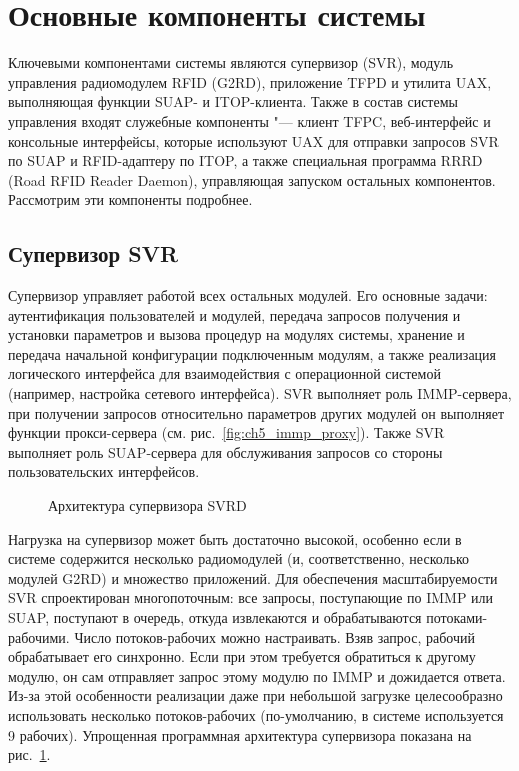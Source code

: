 \section{Основные компоненты системы}\label{sec:ch5_components}

Ключевыми компонентами системы являются супервизор (SVR), модуль управления радиомодулем RFID (G2RD), приложение TFPD и утилита UAX, выполняющая функции SUAP- и ITOP-клиента. Также в состав системы управления входят служебные компоненты "--- клиент TFPC, веб-интерфейс и консольные интерфейсы, которые используют UAX для отправки запросов SVR по SUAP и RFID-адаптеру по ITOP, а также специальная программа RRRD (Road RFID Reader Daemon), управляющая запуском остальных компонентов. Рассмотрим эти компоненты подробнее.


\subsection{Супервизор SVR}\label{sec:ch5_components_svr}

Супервизор управляет работой всех остальных модулей. Его основные задачи: аутентификация пользователей и модулей, передача запросов получения и установки параметров и вызова процедур на модулях системы, хранение и передача начальной конфигурации подключенным модулям, а также реализация логического интерфейса для взаимодействия с операционной системой (например, настройка сетевого интерфейса). SVR выполняет роль IMMP-сервера, при получении запросов относительно параметров других модулей он выполняет функции прокси-сервера (см. рис.~\ref{fig:ch5_immp_proxy}). Также SVR выполняет роль SUAP-сервера для обслуживания запросов со стороны пользовательских интерфейсов.

\begin{figure}[ht]
  \caption{Архитектура супервизора SVRD}
  \label{fig:ch5_svrd_threads}
\end{figure}

Нагрузка на супервизор может быть достаточно высокой, особенно если в системе содержится несколько радиомодулей (и, соответственно, несколько модулей G2RD) и множество приложений. Для обеспечения масштабируемости SVR спроектирован многопоточным: все запросы, поступающие по IMMP или SUAP, поступают в очередь, откуда извлекаются и обрабатываются потоками-рабочими. Число потоков-рабочих можно настраивать. Взяв запрос, рабочий обрабатывает его синхронно. Если при этом требуется обратиться к другому модулю, он сам отправляет запрос этому модулю по IMMP и дожидается ответа. Из-за этой особенности реализации даже при небольшой загрузке целесообразно использовать несколько потоков-рабочих (по-умолчанию, в системе используется 9 рабочих). Упрощенная программная архитектура супервизора показана на рис.~\ref{fig:ch5_svrd_threads}.

